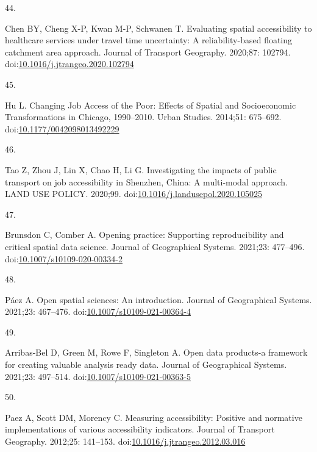 \documentclass[10pt,letterpaper]{article}
\newlength{\cslhangindent}
\newlength{\csllabelwidth}
\newlength{\cslentryspacingunit} %
\newenvironment{CSLReferences}[2] %
 {%
  \setlength{\parindent}{0pt}
  \ifodd #1
  \let\oldpar\par
  \def\par{\hangindent=\cslhangindent\oldpar}
  \fi
  \setlength{\parskip}{#2\cslentryspacingunit}
 }%
 {}
\newcommand{\CSLLeftMargin}[1]{\parbox[t]{\csllabelwidth}{#1}}
\newcommand{\CSLRightInline}[1]{\parbox[t]{\linewidth - \csllabelwidth}{#1}\break}
\begin{document}
\begin{CSLReferences}{0}{0}
\leavevmode{}%
\CSLLeftMargin{44. }%
\CSLRightInline{Chen BY, Cheng X-P, Kwan M-P, Schwanen T. Evaluating
spatial accessibility to healthcare services under travel time
uncertainty: {A} reliability-based floating catchment area approach.
Journal of Transport Geography. 2020;87: 102794.
doi:\href{https://doi.org/10.1016/j.jtrangeo.2020.102794}{10.1016/j.jtrangeo.2020.102794}}

\leavevmode{}%
\CSLLeftMargin{45. }%
\CSLRightInline{Hu L. Changing {Job} {Access} of the {Poor}: {Effects}
of {Spatial} and {Socioeconomic} {Transformations} in {Chicago},
1990--2010. Urban Studies. 2014;51: 675--692.
doi:\href{https://doi.org/10.1177/0042098013492229}{10.1177/0042098013492229}}

\leavevmode{}%
\CSLLeftMargin{46. }%
\CSLRightInline{Tao Z, Zhou J, Lin X, Chao H, Li G. Investigating the
impacts of public transport on job accessibility in {Shenzhen}, {China}:
A multi-modal approach. LAND USE POLICY. 2020;99.
doi:\href{https://doi.org/10.1016/j.landusepol.2020.105025}{10.1016/j.landusepol.2020.105025}}

\leavevmode{}%
\CSLLeftMargin{47. }%
\CSLRightInline{Brunsdon C, Comber A. Opening practice: Supporting
reproducibility and critical spatial data science. Journal of
Geographical Systems. 2021;23: 477--496.
doi:\href{https://doi.org/10.1007/s10109-020-00334-2}{10.1007/s10109-020-00334-2}}

\leavevmode{}%
\CSLLeftMargin{48. }%
\CSLRightInline{Páez A. Open spatial sciences: An introduction. Journal
of Geographical Systems. 2021;23: 467--476.
doi:\href{https://doi.org/10.1007/s10109-021-00364-4}{10.1007/s10109-021-00364-4}}

\leavevmode{}%
\CSLLeftMargin{49. }%
\CSLRightInline{Arribas-Bel D, Green M, Rowe F, Singleton A. Open data
products-a framework for creating valuable analysis ready data. Journal
of Geographical Systems. 2021;23: 497--514.
doi:\href{https://doi.org/10.1007/s10109-021-00363-5}{10.1007/s10109-021-00363-5}}

\leavevmode{}%
\CSLLeftMargin{50. }%
\CSLRightInline{Paez A, Scott DM, Morency C. Measuring accessibility:
Positive and normative implementations of various accessibility
indicators. Journal of Transport Geography. 2012;25: 141--153.
doi:\href{https://doi.org/10.1016/j.jtrangeo.2012.03.016}{10.1016/j.jtrangeo.2012.03.016}}


\end{CSLReferences}
\end{document}

